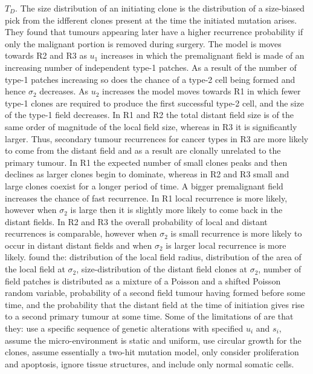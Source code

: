 \documentclass[\main/thesis.tex]{subfiles}
\begin{document}
$T_D$. The size distribution of an initiating clone is the distribution of a 
size-biased pick from the idfferent clones present at the time the initiated 
mutation arises. They found that tumours appearing later have a higher recurrence 
probability if only the malignant portion is removed during surgery. The model 
is moves towards R2 and R3 as $u_1$ increases in which the premalignant field is 
made of an increasing number of independent type-1 patches. As a result of the 
number of type-1 patches increasing so does the chance of a type-2 cell being 
formed and hence $\sigma_2$ decreases. As $u_2$ increases the model moves 
towards R1 in which fewer type-1 clones are required to produce the first 
successful type-2 cell, and the size of the type-1 field decreases. In R1 and R2 
the total distant field size is of the same order of magnitude of the local 
field size, whereas in R3 it is significantly larger. Thus, secondary tumour 
recurrences for cancer types in R3 are more likely to come from the distant 
field and as a result are clonally unrelated to the primary tumour. In R1 the 
expected number of small clones peaks and then declines as larger clones begin 
to dominate, whereas in R2 and R3 small and large clones coexist for a longer 
period of time. A bigger premalignant field increases the chance of fast 
recurrence. In R1 local recurrence is more likely, however when 
$\sigma_2$ is large then it is slightly more likely to come back in the distant 
fields. In R2 and R3 the overall probability of local and distant recurrences is 
comparable, however when $\sigma_2$ is small recurrence is more likely to occur 
in distant distant fields and when $\sigma_2$ is larger local recurrence is more 
likely. \textcite{Foo} found the: distribution of the local field radius, 
distribution of the area of the local field at $\sigma_2$, size-distribution of 
the distant field clones at $\sigma_2$, number of field patches is distributed 
as a mixture of a Poisson and a shifted Poisson random variable, probability of 
a second field tumour having formed before some time, and the probability that 
the distant field at the time of initiation gives rise to a second primary 
tumour at some time. Some of the limitations of \textcite{Foo} are that they: 
use a specific sequence of genetic alterations with specified $u_i$ and $s_i$, 
assume the micro-environment is static and uniform, use circular growth for the 
clones, assume essentially a two-hit mutation model, only consider proliferation 
and apoptosis, ignore tissue structures, and include only normal somatic cells. 
\end{document}
